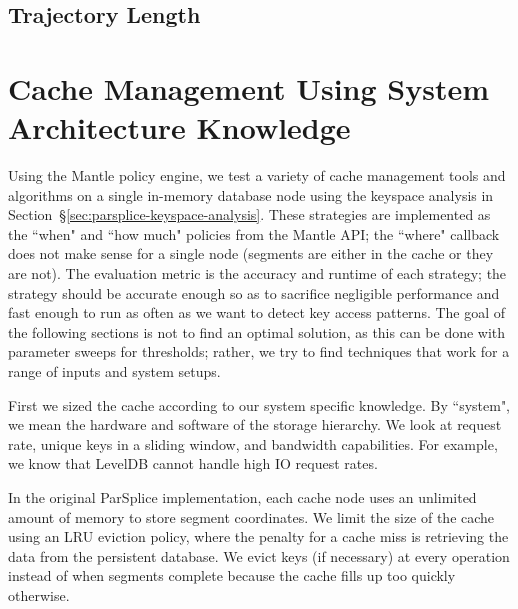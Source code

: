 \subsection{Trajectory Length}
%
%
%
%

\section{Cache Management Using System Architecture Knowledge}
\label{sec:arch-specific}

Using the Mantle policy engine, we test a variety of cache management tools and
algorithms on a single in-memory database node using the keyspace analysis in
Section~\S\ref{sec:parsplice-keyspace-analysis}. These strategies are
implemented as the ``when" and ``how much" policies from the Mantle API; the
``where" callback does not make sense for a single node (segments are either in
the cache or they are not). The evaluation metric is the accuracy and runtime
of each strategy; the strategy should be accurate enough so as to sacrifice
negligible performance and fast enough to run as often as we want to detect key
access patterns. The goal of the following sections is not to find an optimal
solution, as this can be done with parameter sweeps for thresholds; rather, we
try to find techniques that work for a range of inputs and system setups.

First we sized the cache according to our system specific knowledge. By
``system", we mean the hardware and software of the storage hierarchy. We look
at request rate, unique keys in a sliding window, and bandwidth capabilities. For
example, we know that LevelDB cannot handle high IO request rates.

In the original ParSplice implementation, each cache node uses an unlimited
amount of memory to store segment coordinates. We limit the size of the cache
using an LRU eviction policy, where the penalty for a cache miss is retrieving
the data from the persistent database.  We evict keys (if necessary) at every
operation instead of when segments complete because the cache fills up too
quickly otherwise.

